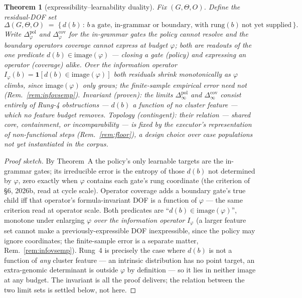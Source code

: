 \documentclass[11pt]{article}
\theoremstyle{plain}
\newtheorem{theorem}{Theorem}
\theoremstyle{definition}
\begin{document}
\begin{theorem}[expressibility--learnability duality]\label{thm:dual}
Fix $(G,\Theta,O)$. Define the residual-DOF set
\[
\Delta(G,\Theta,O)\;=\;\{\,d(b)\,:\,b\ \text{a gate, in-grammar or boundary, with }\mathrm{rung}(b)\ \text{not yet supplied}\,\}.
\]
Write $\Delta^{\mathrm{pol}}_\varphi$ and $\Delta^{\mathrm{cov}}_\varphi$ for the in-grammar gates the policy cannot resolve and the boundary operators coverage cannot express at budget $\varphi$; both are readouts of the one predicate $d(b)\in\mathrm{image}(\varphi)$ --- closing a gate (policy) and expressing an operator (coverage) alike. \emph{Over the information operator} $I_\varphi(b)=\mathbf{1}[d(b)\in\mathrm{image}(\varphi)]$ both residuals shrink monotonically as $\varphi$ climbs, since $\mathrm{image}(\varphi)$ only grows; the finite-sample empirical error need not (Rem.~\ref{rem:infovsemp}). \emph{Invariant (proven):} the limits $\Delta^{\mathrm{pol}}_\infty$ and $\Delta^{\mathrm{cov}}_\infty$ consist entirely of Rung-4 obstructions --- $d(b)$ a function of no cluster feature --- which no feature budget removes. \emph{Topology (contingent):} their relation --- shared core, containment, or incomparability --- is fixed by the executor's representation of non-functional steps (Rem.~\ref{rem:floor}), a design choice over case populations not yet instantiated in the corpus.
\end{theorem}

\begin{proof}[Proof sketch]
By Theorem~A the policy's only learnable targets are the in-grammar gates; its irreducible error is the entropy of those $d(b)$ not determined by $\varphi$, zero exactly when $\varphi$ contains each gate's rung coordinate (the criterion of \S6, 2026b, read at cycle scale). Operator coverage adds a boundary gate's true child iff that operator's formula-invariant DOF is a function of $\varphi$ --- the same criterion read at operator scale. Both predicates are ``$d(b)\in\mathrm{image}(\varphi)$'', monotone under enlarging $\varphi$ \emph{over the information operator} $I_\varphi$ (a larger feature set cannot make a previously-expressible DOF inexpressible, since the policy may ignore coordinates; the finite-sample error is a separate matter, Rem.~\ref{rem:infovsemp}). Rung~4 is precisely the case where $d(b)$ is not a function of \emph{any} cluster feature --- an intrinsic distribution has no point target, an extra-genomic determinant is outside $\varphi$ by definition --- so it lies in neither image at any budget. The invariant is all the proof delivers; the relation between the two limit sets is settled below, not here.
\end{proof}
\end{document}
